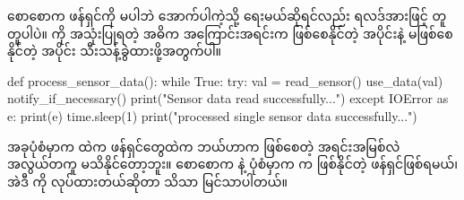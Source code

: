 စောစောက ဖန်ရှင်ကို  မပါဘဲ အောက်ပါကဲ့သို့ ရေးမယ်ဆိုရင်လည်း ရလဒ်အားဖြင့် တူတူပါပဲ။  ကို အသုံးပြုရတဲ့ အဓိက အကြောင်းအရင်းက  ဖြစ်စေနိုင်တဲ့ အပိုင်းနဲ့ မဖြစ်စေနိုင်တဲ့ အပိုင်း သီးသန့်ခွဲထားဖို့အတွက်ပါ။ 
%
%
\begin{py}
def process_sensor_data():
    while True:
        try:
            val = read_sensor()
            use_data(val)
            notify_if_necessary()
            print("Sensor data read successfully...")
        except IOError as e:
            print(e)
        time.sleep(1)
        print("processed single sensor data successfully...")
\end{py}
%
အခုပုံစံမှာက  ထဲက ဖန်ရှင်တွေထဲက ဘယ်ဟာက  ဖြစ်စေတဲ့ အရင်းအမြစ်လဲ အလွယ်\allowbreak တကူ မသိနိုင်တော့ဘူး။ စောစောက  နဲ့ ပုံစံမှာက  က  ဖြစ်နိုင်တဲ့ ဖန်ရှင်ဖြစ်ရမယ်၊ အဲဒီ  ကို  လုပ်ထားတယ်ဆိုတာ သိသာ မြင်သာပါတယ်။%
%
\vspace{-1\baselineskip}
